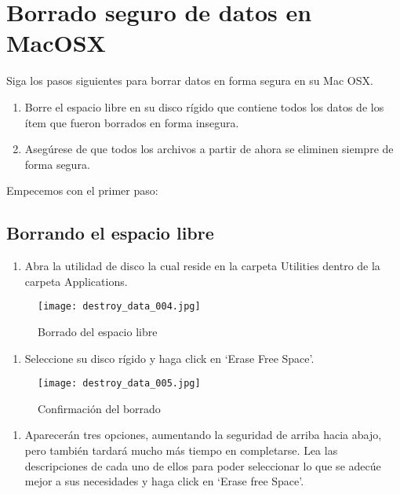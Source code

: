 \documentclass[10pt,a5paper,twoside,,]{book}
\providecommand{\tightlist}{%
  \setlength{\itemsep}{0pt}\setlength{\parskip}{0pt}}
\begin{document}
\section{Borrado seguro de datos en
MacOSX}\label{borrado-seguro-de-datos-en-macosx}

Siga los pasos siguientes para borrar datos en forma segura en su Mac
OSX.

\begin{enumerate}
\def\labelenumi{\arabic{enumi}.}
\item
  Borre el espacio libre en su disco rígido que contiene todos los datos
  de los ítem que fueron borrados en forma insegura.
\item
  Asegúrese de que todos los archivos a partir de ahora se eliminen
  siempre de forma segura.
\end{enumerate}

Empecemos con el primer paso:

\subsection{Borrando el espacio libre}\label{borrando-el-espacio-libre}

\begin{enumerate}
\def\labelenumi{\arabic{enumi}.}
\tightlist
\item
  Abra la utilidad de disco la cual reside en la carpeta Utilities
  dentro de la carpeta Applications.
\end{enumerate}

\begin{figure}[htbp]
\centering
\texttt{[image: destroy\_data\_004.jpg]}
\caption{Borrado del espacio libre}
\end{figure}

\begin{enumerate}
\def\labelenumi{\arabic{enumi}.}
\setcounter{enumi}{1}
\tightlist
\item
  Seleccione su disco rígido y haga click en `Erase Free Space'.
\end{enumerate}

\begin{figure}[htbp]
\centering
\texttt{[image: destroy\_data\_005.jpg]}
\caption{Confirmación del borrado}
\end{figure}

\begin{enumerate}
\def\labelenumi{\arabic{enumi}.}
\setcounter{enumi}{2}
\tightlist
\item
  Aparecerán tres opciones, aumentando la seguridad de arriba hacia
  abajo, pero también tardará mucho más tiempo en completarse. Lea las
  descripciones de cada uno de ellos para poder seleccionar lo que se
  adecúe mejor a sus necesidades y haga click en `Erase free Space'.
\end{enumerate}
\end{document}
